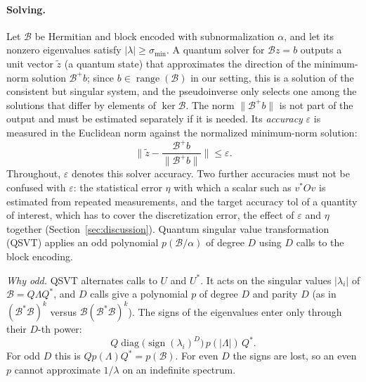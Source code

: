 \documentclass[11pt,a4paper]{article}
\newcommand{\B}{\mathcal{B}}
\theoremstyle{remark}
\begin{document}
\paragraph{Solving.} Let $\B$ be Hermitian and block encoded with subnormalization
$\alpha$, and let its nonzero eigenvalues satisfy $|\lambda|\ge\sigma_{\min}$. A quantum solver
for $\B z=b$ outputs a unit vector $\tilde z$ (a quantum state) that approximates
the direction of the minimum-norm solution $\B^+b$; since $b\in\operatorname{range}(\B)$ in our
setting, this is a solution of the consistent but singular system, and the
pseudoinverse only selects one among the solutions that differ by
elements of $\ker\B$. The norm $\|\B^+b\|$ is not part of the output and must be
estimated separately if it is needed. Its
\emph{accuracy} $\varepsilon$ is measured in the Euclidean norm against the normalized
minimum-norm solution:
\begin{equation}\label{eq:eps}
\Big\|\tilde z-\frac{\B^+b}{\|\B^+b\|}\Big\|\le\varepsilon .
\end{equation}
Throughout, $\varepsilon$ denotes this solver accuracy. Two further accuracies
must not be confused with $\varepsilon$: the statistical error $\eta$ with which a
scalar such as $v^*Ov$ is estimated from repeated measurements, and the target accuracy $\mathrm{tol}$ of a quantity
of interest, which has to cover the discretization error, the effect of $\varepsilon$
and $\eta$ together (Section~\ref{sec:discussion}). Quantum
singular value transformation (QSVT) \cite{GSLW19} applies an odd polynomial
$p(\B/\alpha)$ of degree $D$ using $D$ calls to the block encoding.

\emph{Why odd.} QSVT alternates calls to $U$ and $U^*$. It acts on the
singular values $|\lambda_i|$ of $\B=Q\Lambda Q^*$, and $D$ calls give a polynomial
$p$ of degree $D$ and parity $D$ (as in $(\B^*\B)^k$ versus $\B(\B^*\B)^k$). The signs
of the eigenvalues enter only through their $D$-th power:
\[
Q\operatorname{diag}\big(\operatorname{sign}(\lambda_i)^D\big)\,p(|\Lambda|)\,Q^* .
\]
For odd $D$ this is $Qp(\Lambda)Q^*=p(\B)$. For even $D$ the signs are lost, so an
even $p$ cannot approximate $1/\lambda$ on an indefinite spectrum.
\end{document}
